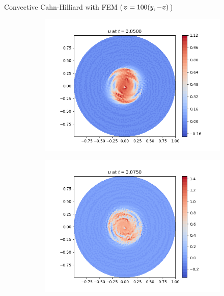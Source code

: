 \begin{frame}{Convective Cahn-Hilliard with FEM {\small($\boldsymbol{v}=100(y,-x)$)}}
\begin{figure}[t]
		\begin{subfigure}{0.49\textwidth}
			\centering
			\includegraphics[scale=0.28]{img/convective-cahn-hilliard/u_FE+Eyre_nt-100_t-0.05000_P1_adv-100.0_nx-50.png}
		\end{subfigure}
		\hspace*{-1.5cm}
		\begin{subfigure}{0.49\textwidth}
			\centering
			\includegraphics[scale=0.28]{img/convective-cahn-hilliard/u_FE+Eyre_nt-100_t-0.07500_P1_adv-100.0_nx-50.png}
		\end{subfigure}
	\end{figure}
\end{frame}


